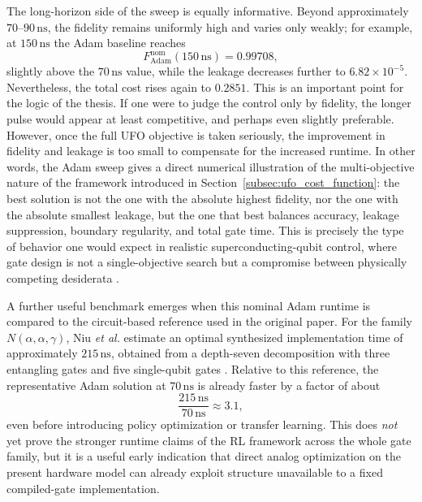 The long-horizon side of the sweep is equally informative. Beyond approximately \(70\)--\(90\,\mathrm{ns}\), the fidelity remains uniformly high and varies only weakly; for example, at \(150\,\mathrm{ns}\) the Adam baseline reaches
\begin{equation}
F_{\mathrm{Adam}}^{\mathrm{nom}}(150\,\mathrm{ns}) = 0.99708,
\end{equation}
slightly above the \(70\,\mathrm{ns}\) value, while the leakage decreases further to \(6.82\times10^{-5}\). Nevertheless, the total cost rises again to \(0.2851\). This is an important point for the logic of the thesis. If one were to judge the control only by fidelity, the longer pulse would appear at least competitive, and perhaps even slightly preferable. However, once the full UFO objective is taken seriously, the improvement in fidelity and leakage is too small to compensate for the increased runtime. 
In other words, the Adam sweep gives a direct numerical illustration of the multi-objective nature of the framework introduced in Section~\ref{subsec:ufo_cost_function}: the best solution is not the one with the absolute highest fidelity, nor the one with the absolute smallest leakage, but the one that best balances accuracy, leakage suppression, boundary regularity, and total gate time. This is precisely the type of behavior one would expect in realistic superconducting-qubit control, where gate design is not a single-objective search but a compromise between physically competing desiderata \cite{Niu2019,Koch2022}.

A further useful benchmark emerges when this nominal Adam runtime is compared to the circuit-based reference used in the original paper. For the family \(N(\alpha,\alpha,\gamma)\), Niu \emph{et al.} estimate an optimal synthesized implementation time of approximately \(215\,\mathrm{ns}\), obtained from a depth-seven decomposition with three entangling gates and five single-qubit gates \cite{Niu2019}. Relative to this reference, the representative Adam solution at \(70\,\mathrm{ns}\) is already faster by a factor of about
\begin{equation}
\frac{215\,\mathrm{ns}}{70\,\mathrm{ns}} \approx 3.1,
\end{equation}
even before introducing policy optimization or transfer learning. This does \emph{not} yet prove the stronger runtime claims of the RL framework across the whole gate family, but it is a useful early indication that direct analog optimization on the present hardware model can already exploit structure unavailable to a fixed compiled-gate implementation.

